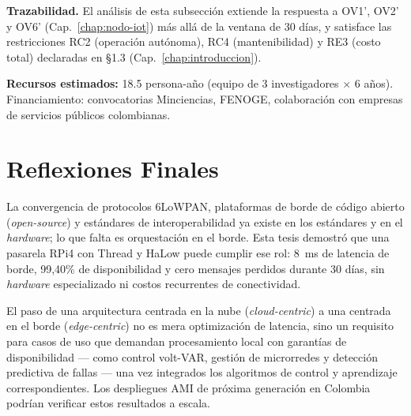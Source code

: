 \bigskip
\textbf{Trazabilidad.} El análisis de esta subsección extiende la respuesta a OV1', OV2' y OV6' (Cap.~\ref{chap:nodo-iot}) más allá de la ventana de 30 días, y satisface las restricciones RC2 (operación autónoma), RC4 (mantenibilidad) y RE3 (costo total) declaradas en §1.3 (Cap.~\ref{chap:introduccion}).

\textbf{Recursos estimados:} 18.5 persona-año (equipo de 3 investigadores $\times$ 6 años). Financiamiento: convocatorias Minciencias, FENOGE, colaboración con empresas de servicios públicos colombianas.

\section{Reflexiones Finales}

La convergencia de protocolos 6LoWPAN, plataformas de borde de código abierto (\emph{open-source}) y estándares de interoperabilidad ya existe en los estándares y en el \emph{hardware}; lo que falta es orquestación en el borde. Esta tesis demostró que una pasarela RPi4 con Thread y HaLow puede cumplir ese rol: 8~ms de latencia de borde, 99,40\% de disponibilidad y cero mensajes perdidos durante 30 días, sin \emph{hardware} especializado ni costos recurrentes de conectividad.

El paso de una arquitectura centrada en la nube (\emph{cloud-centric}) a una centrada en el borde (\emph{edge-centric}) no es mera optimización de latencia, sino un requisito para casos de uso que demandan procesamiento local con garantías de disponibilidad --- como control volt-VAR, gestión de microrredes y detección predictiva de fallas --- una vez integrados los algoritmos de control y aprendizaje correspondientes. Los despliegues AMI de próxima generación en Colombia podrían verificar estos resultados a escala.

